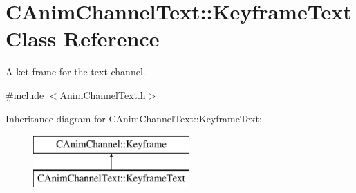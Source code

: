 \hypertarget{class_c_anim_channel_text_1_1_keyframe_text}{\section{C\+Anim\+Channel\+Text\+:\+:Keyframe\+Text Class Reference}
\label{class_c_anim_channel_text_1_1_keyframe_text}
}


A ket frame for the text channel.  




{\ttfamily \#include $<$Anim\+Channel\+Text.\+h$>$}

Inheritance diagram for C\+Anim\+Channel\+Text\+:\+:Keyframe\+Text\+:\begin{figure}[H]
\begin{center}
\leavevmode
\includegraphics[height=2.000000cm]{class_c_anim_channel_text_1_1_keyframe_text}
\end{center}
\end{figure}
